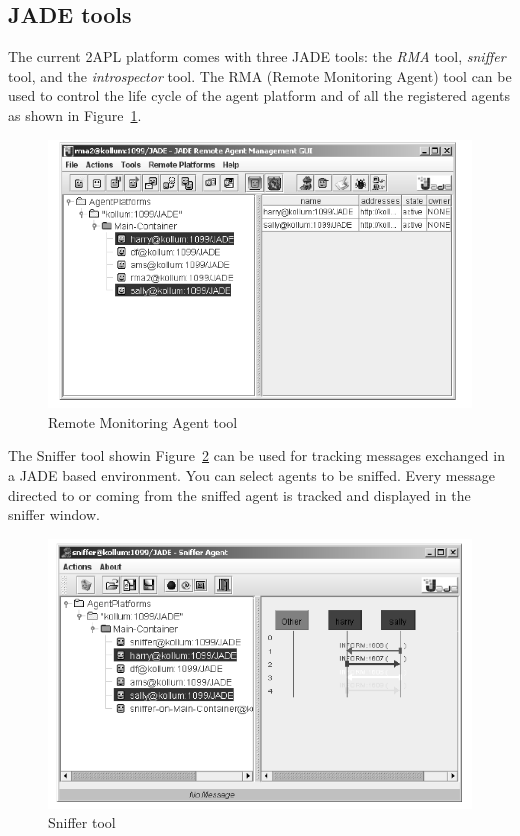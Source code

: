 \documentclass[a4paper]{article}
\begin{document}
\subsection{JADE tools}

The current 2APL platform comes with three JADE tools: the \emph{RMA} tool, \emph{sniffer} tool, and the
\emph{introspector} tool. The RMA (Remote Monitoring Agent) tool can be used to control the life cycle of the agent platform and of all the registered agents as shown in Figure~\ref{fig:rma}.

\begin{figure}[htp]
\centering
\includegraphics[keepaspectratio,scale=0.7]{fig/rma.png}
\caption{Remote Monitoring Agent tool}
\label{fig:rma}
\end{figure}

The Sniffer tool showin Figure~\ref{fig:sniffer} can be used for tracking messages exchanged in a JADE based environment.
You can select agents to be sniffed. Every message directed to or coming from the sniffed agent is tracked and displayed in the sniffer window.

\begin{figure}[htp]
\centering
\includegraphics[keepaspectratio,scale=0.7]{fig/sniffer.png}
\caption{Sniffer tool}
\label{fig:sniffer}
\end{figure}
\end{document}
